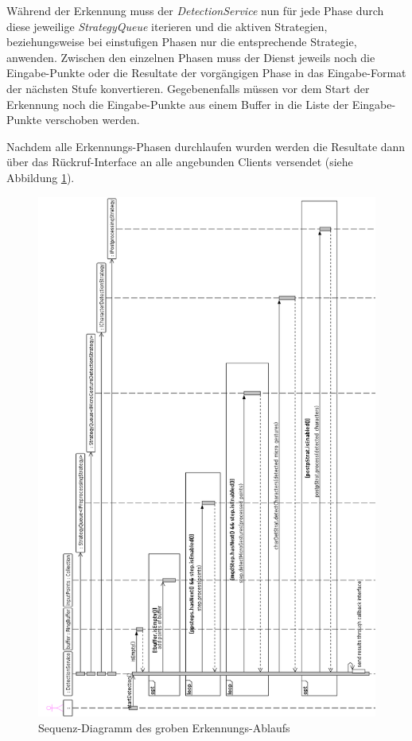 Während der Erkennung muss der \emph{DetectionService} nun für jede Phase durch diese jeweilige \emph{StrategyQueue} iterieren und die aktiven Strategien, beziehungsweise bei einstufigen Phasen nur die entsprechende Strategie, anwenden. Zwischen den einzelnen Phasen muss der Dienst jeweils noch die Eingabe-Punkte oder die Resultate der vorgängigen Phase in das Eingabe-Format der nächsten Stufe konvertieren. Gegebenenfalls müssen vor dem Start der Erkennung noch die Eingabe-Punkte aus einem Buffer in die Liste der Eingabe-Punkte verschoben werden.

Nachdem alle Erkennungs-Phasen durchlaufen wurden werden die Resultate dann über das Rückruf-Interface an alle angebunden Clients versendet (siehe Abbildung \ref{fig:sd_detection}).

\begin{figure}[h!]
   \centering
   \includegraphics[height=\textheight]{img/uml_sd_detection} 
   \caption{Sequenz-Diagramm des groben Erkennungs-Ablaufs}
   \label{fig:sd_detection}
\end{figure}

